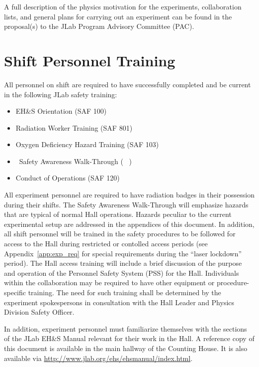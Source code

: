 \documentclass[10pt]{article}
\begin{document}
A full description of the physics motivation for the experiments, collaboration
lists, and general plans for carrying out an experiment can be found in the
proposal(s) to the JLab Program Advisory Committee (PAC).

\section{Shift Personnel Training}

All personnel on shift are required to have successfully completed and be
current in the following JLab safety training:

\begin{itemize}

\item EH\&S Orientation (SAF 100)

\item Radiation Worker Training (SAF 801)

\item Oxygen Deficiency Hazard Training (SAF 103)

\item \HALL\ Safety Awareness Walk-Through ( \AWARENESS\ )

\item Conduct of Operations (SAF 120)

\end{itemize}

 All experiment personnel are
required to have radiation badges in their possession during their shifts.
The Safety Awareness Walk-Through will
emphasize hazards that are typical of normal Hall operations.
Hazards peculiar to the current experimental setup are addressed in the appendices
of this document.
In addition, all shift personnel will be trained in the safety procedures to be
followed for access to the Hall during restricted or contolled access
periods (see Appendix~\ref{app:exp_req} for special requirements during 
the ``laser lockdown'' period). The Hall access 
training will include a brief discussion of the purpose and operation of the
Personnel Safety System (PSS) for the Hall.
Individuals within the collaboration may be required to have other equipment
or procedure-specific training. The need for such
training shall be determined by the experiment spokespersons in consultation
with the Hall Leader and Physics Division Safety Officer.

In addition, experiment personnel must familiarize themselves with the
sections of the JLab EH\&S Manual relevant for their work in the Hall.
A reference copy of this
document is available in the main hallway of the Counting House. It is also
available via \url{http://www.jlab.org/ehs/ehsmanual/index.html}.
\end{document}
